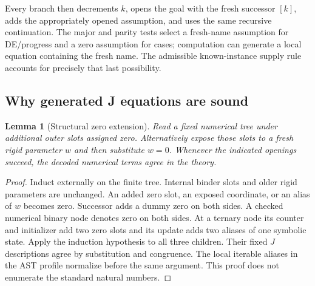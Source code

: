 \documentclass[11pt,letterpaper]{article}
\newtheorem{lemma}[theorem]{Lemma}
\theoremstyle{definition}\newtheorem{definition}[theorem]{Definition}
\theoremstyle{remark}\newtheorem{remark}[theorem]{Remark}
\begin{document}
Every branch then decrements $k$, opens the goal with the fresh successor
$[k]$, adds the appropriately opened assumption, and uses the same
recursive continuation. The major and parity tests select a fresh-name
assumption for DE/progress and a zero assumption for cases; computation
can generate a local equation containing the fresh name. The admissible
known-instance supply rule accounts for precisely that last possibility.

\subsection{Why generated J equations are sound}

\begin{lemma}[Structural zero extension]\label{impl:zero}
Read a fixed numerical tree under additional outer slots assigned zero.
Alternatively expose those slots to a fresh rigid parameter $w$ and then
substitute $w=0$. Whenever the indicated openings succeed, the decoded
numerical terms agree in the theory.
\end{lemma}
\begin{proof}
Induct externally on the finite tree. Internal binder slots and older
rigid parameters are unchanged. An added zero slot, an exposed coordinate,
or an alias of $w$ becomes zero. Successor adds a dummy zero on both
sides. A checked numerical binary node denotes zero on both sides.
At a ternary node its counter and initializer add two zero slots and its
update adds two aliases of one symbolic state. Apply the induction
hypothesis to all three children. Their fixed $J$ descriptions agree by
substitution and congruence. The local iterable aliases in the AST profile
normalize before the same argument. This proof does not enumerate the
standard natural numbers.
\end{proof}
\end{document}
